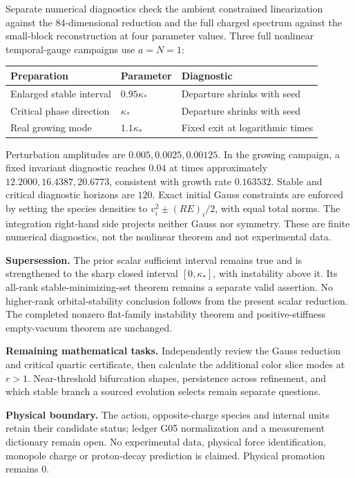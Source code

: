 \documentclass[11pt,a4paper]{article}
\begin{document}
Separate numerical diagnostics check the ambient constrained linearization against the 84-dimensional reduction and the full charged spectrum against the small-block reconstruction at four parameter values. Three full nonlinear temporal-gauge campaigns use $a=N=1$:
\begin{center}
\begin{tabular}{lll}
\toprule
Preparation & Parameter & Diagnostic\\
\midrule
Enlarged stable interval & $0.95\kappa_*$ & Departure shrinks with seed\\
Critical phase direction & $\kappa_*$ & Departure shrinks with seed\\
Real growing mode & $1.1\kappa_*$ & Fixed exit at logarithmic times\\
\bottomrule
\end{tabular}
\end{center}
Perturbation amplitudes are $0.005,0.0025,0.00125$. In the growing campaign, a fixed invariant diagnostic reaches $0.04$ at times approximately $12.2000,16.4387,20.6773$, consistent with growth rate $0.163532$. Stable and critical diagnostic horizons are $120$. Exact initial Gauss constraints are enforced by setting the species densities to $v_i^2\pm(RE)_i/2$, with equal total norms. The integration right-hand side projects neither Gauss nor symmetry. These are finite numerical diagnostics, not the nonlinear theorem and not experimental data.

\textbf{Supersession.} The prior scalar sufficient interval remains true and is strengthened to the sharp closed interval $[0,\kappa_*]$, with instability above it. Its all-rank stable-minimizing-set theorem remains a separate valid assertion. No higher-rank orbital-stability conclusion follows from the present scalar reduction. The completed nonzero flat-family instability theorem and positive-stiffness empty-vacuum theorem are unchanged.

\textbf{Remaining mathematical tasks.} Independently review the Gauss reduction and critical quartic certificate, then calculate the additional color slice modes at $r>1$. Near-threshold bifurcation shapes, persistence across refinement, and which stable branch a sourced evolution selects remain separate questions.

\textbf{Physical boundary.} The action, opposite-charge species and internal units retain their candidate status; ledger G05 normalization and a measurement dictionary remain open. No experimental data, physical force identification, monopole charge or proton-decay prediction is claimed. Physical promotion remains $0$.
\end{document}
